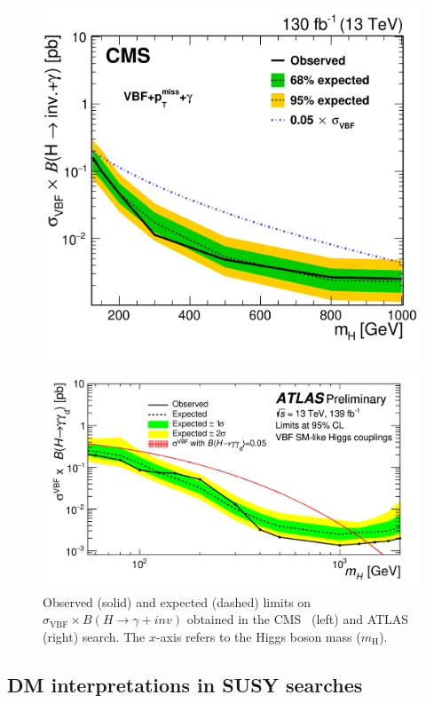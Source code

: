 \documentclass{moriond}
\begin{document}
\begin{figure} [htb]
\begin{minipage}{0.45\linewidth}
\centerline{\includegraphics[width=0.8\linewidth]{cmsvbf}}
\end{minipage}
\begin{minipage}{0.5\linewidth}
\centerline{\includegraphics[width=1.0\linewidth]{atlasvbf}}
\end{minipage}
\caption[]{Observed (solid) and expected (dashed) limits on $\sigma_{\mathrm{VBF}}\times B(H\rightarrow\gamma+inv)$ obtained in the CMS~\cite{cmsvbf} (left) and ATLAS~\cite{atlasvbf} (right) search. The $x$-axis refers to the Higgs boson mass ($m_{\mathrm{H}}$).}
\label{fig:vbf}
\end{figure}

\subsection{DM interpretations in SUSY searches}
\end{document}
